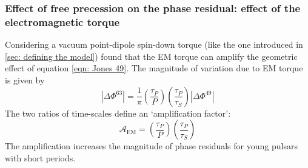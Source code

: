 

\begin{figure}[htb]
\begin{floatrow}
\capbtabbox{%
  
}{%
  \caption{}%
  \label{tab: 49 verification properties}
}
\end{floatrow}
\end{figure}

\FloatBarrier
\subsubsection{Effect of free precession on the phase residual: effect of the 
            electromagnetic torque}
Considering a vacuum point-dipole spin-down torque (like the one introduced in 
\ref{sec: defining the model}) \citet{Jones2001} found that the EM torque can
amplify the geometric effect of equation \eqref{eqn: Jones 49}. The magnitude
of variation due to EM torque is given by 
\begin{equation}
    |\Delta\Phi^{63}| = \frac{1}{\pi}\left(\frac{\tau_{P}}{P}\right)
    \left(\frac{\tau_{P}}{\tau_{S}}\right) 
                                    |\Delta\Phi^{49}|
\label{eqn: Jones 63}
\end{equation}
The two ratios of time-scales define an `amplification factor':
\begin{equation}
    \mathcal{A}_{\mathrm{EM}} = \left(\frac{\tau_{P}}{P}\right)
                                \left(\frac{\tau_{P}}{\tau_{S}}\right) 
\label{eqn: EM amplification}
\end{equation}
The amplification increases
the magnitude of phase residuals for young pulsars with short periods.

